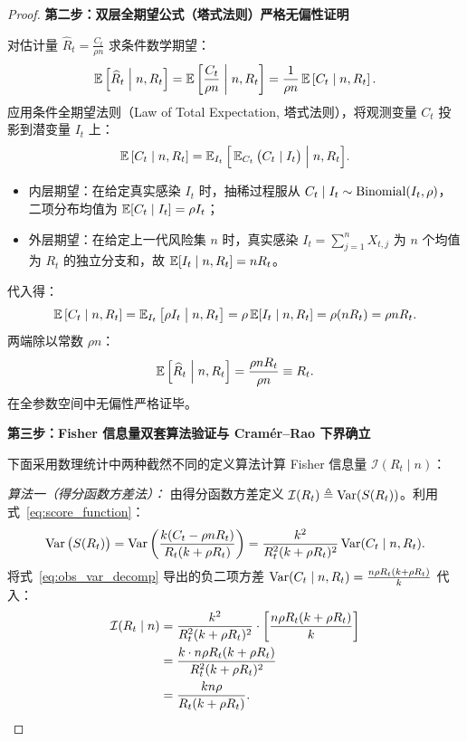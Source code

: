 \begin{proof}
\textbf{第二步：双层全期望公式（塔式法则）严格无偏性证明}

对估计量 $\widehat{R}_t = \frac{C_t}{\rho n}$ 求条件数学期望：
\begin{equation}
\operatorname{\mathbb{E}}\left[ \widehat{R}_t \;\middle|\; n, R_t \right] = \operatorname{\mathbb{E}}\left[ \frac{C_t}{\rho n} \;\middle|\; n, R_t \right] = \frac{1}{\rho n} \operatorname{\mathbb{E}}\left[ C_t \;\middle|\; n, R_t \right].
\end{equation}
应用条件全期望法则（Law of Total Expectation, 塔式法则），将观测变量 $C_t$ 投影到潜变量 $I_t$ 上：
\begin{equation}
\operatorname{\mathbb{E}}\left[ C_t \;\middle|\; n, R_t \right] = \operatorname{\mathbb{E}}_{I_t}\Big[ \operatorname{\mathbb{E}}_{C_t}\big( C_t \mid I_t \big) \;\Big|\; n, R_t \Big].
\end{equation}
\begin{itemize}
    \item 内层期望：在给定真实感染 $I_t$ 时，抽稀过程服从 $C_t \mid I_t \sim \operatorname{Binomial}(I_t, \rho)$，二项分布均值为 $\operatorname{\mathbb{E}}[C_t \mid I_t] = \rho I_t$；
    \item 外层期望：在给定上一代风险集 $n$ 时，真实感染 $I_t = \sum_{j=1}^n X_{t,j}$ 为 $n$ 个均值为 $R_t$ 的独立分支和，故 $\operatorname{\mathbb{E}}[I_t \mid n, R_t] = n R_t$。
\end{itemize}
代入得：
\begin{equation}
\operatorname{\mathbb{E}}\left[ C_t \;\middle|\; n, R_t \right] = \operatorname{\mathbb{E}}_{I_t}\big[ \rho I_t \;\big|\; n, R_t \big] = \rho \operatorname{\mathbb{E}}[I_t \mid n, R_t] = \rho(n R_t) = \rho n R_t.
\end{equation}
两端除以常数 $\rho n$：
\begin{equation}
\operatorname{\mathbb{E}}\left[ \widehat{R}_t \;\middle|\; n, R_t \right] = \frac{\rho n R_t}{\rho n} \equiv R_t.
\end{equation}
在全参数空间中无偏性严格证毕。

\textbf{第三步：Fisher 信息量双套算法验证与 Cramér--Rao 下界确立}

下面采用数理统计中两种截然不同的定义算法计算 Fisher 信息量 $\mathcal{I}(R_t \mid n)$：

\textit{算法一（得分函数方差法）：}
由得分函数方差定义 $\mathcal{I}(R_t) \triangleq \operatorname{Var}(S(R_t))$。利用式~\eqref{eq:score_function}：
\begin{equation}
\operatorname{Var}\big( S(R_t) \big) = \operatorname{Var}\left( \frac{k(C_t - \rho n R_t)}{R_t(k + \rho R_t)} \right) = \frac{k^2}{R_t^2 (k + \rho R_t)^2} \operatorname{Var}(C_t \mid n, R_t).
\end{equation}
将式~\eqref{eq:obs_var_decomp} 导出的负二项方差 $\operatorname{Var}(C_t \mid n, R_t) = \frac{n \rho R_t(k + \rho R_t)}{k}$ 代入：
\begin{align}
\mathcal{I}(R_t \mid n) &= \frac{k^2}{R_t^2 (k + \rho R_t)^2} \cdot \left[ \frac{n \rho R_t (k + \rho R_t)}{k} \right] \notag \\
&= \frac{k \cdot n \rho R_t (k + \rho R_t)}{R_t^2 (k + \rho R_t)^2} \notag \\
&= \frac{k n \rho}{R_t (k + \rho R_t)}. \label{eq:fisher_alg1}
\end{align}


\end{proof}
